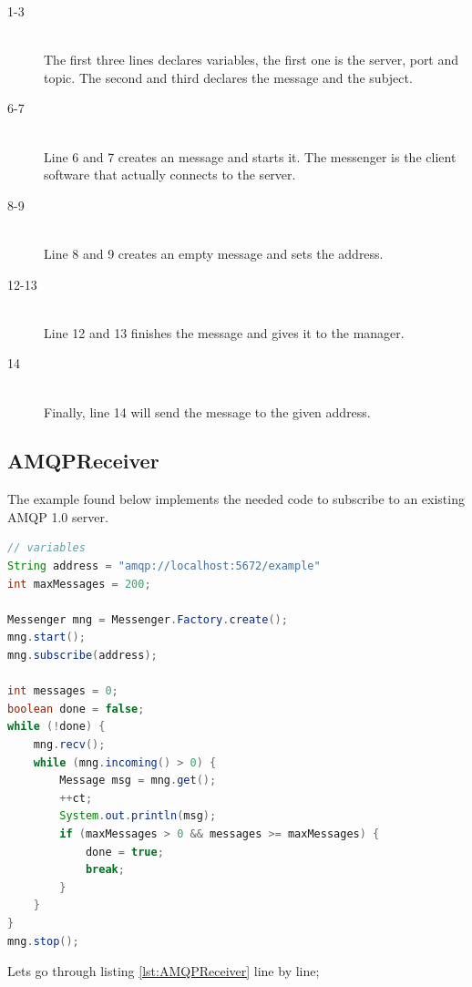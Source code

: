 \begin{description}
\item[1-3] \hfill \\ The first three lines declares variables, the first one is the server, port and topic. The second and third declares the message and the subject.
\item[6-7] \hfill \\ Line 6 and 7 creates an message and starts it. The messenger is the client software that actually connects to the server.
\item[8-9] \hfill \\ Line 8 and 9 creates an empty message and sets the address.
\item[12-13] \hfill \\ Line 12 and 13 finishes the message and gives it to the manager.
\item[14] \hfill \\ Finally, line 14 will send the message to the given address.
\end{description}

\subsection{AMQPReceiver}
The example found below implements the needed code to subscribe to an existing AMQP 1.0 server.


\begin{lstlisting}[language=Java, captionpos=b, caption=Example use of Messenger to subscribe, frame=bt, showstringspaces=false,label={lst:AMQPReceiver}]
// variables
String address = "amqp://localhost:5672/example"
int maxMessages = 200;

Messenger mng = Messenger.Factory.create();
mng.start();
mng.subscribe(address);

int messages = 0;
boolean done = false;
while (!done) {
    mng.recv();
    while (mng.incoming() > 0) {
        Message msg = mng.get();
        ++ct;
        System.out.println(msg);
        if (maxMessages > 0 && messages >= maxMessages) {
            done = true;
            break;
        }
    }
}
mng.stop();
\end{lstlisting}

\noindent Lets go through listing \ref{lst:AMQPReceiver} line by line;

